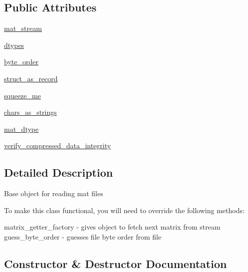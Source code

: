 \subsection*{Public Attributes}
\begin{DoxyCompactItemize}
\item 
\hyperlink{classscipy_1_1io_1_1matlab_1_1miobase_1_1MatFileReader_ac0532e904a5a082297623aebdcfb2376}{mat\+\_\+stream}
\item 
\hyperlink{classscipy_1_1io_1_1matlab_1_1miobase_1_1MatFileReader_ada49fb40fb84de4e19a59eeafece6a0e}{dtypes}
\item 
\hyperlink{classscipy_1_1io_1_1matlab_1_1miobase_1_1MatFileReader_ab4c985b94779e6e3b777efff02341cde}{byte\+\_\+order}
\item 
\hyperlink{classscipy_1_1io_1_1matlab_1_1miobase_1_1MatFileReader_a890f989a74e10934d37a62b93f9310ef}{struct\+\_\+as\+\_\+record}
\item 
\hyperlink{classscipy_1_1io_1_1matlab_1_1miobase_1_1MatFileReader_a6b293b6944a59b8e6a8729d265ff3ad8}{squeeze\+\_\+me}
\item 
\hyperlink{classscipy_1_1io_1_1matlab_1_1miobase_1_1MatFileReader_a2c742fbe640c4773aa56174face7c40f}{chars\+\_\+as\+\_\+strings}
\item 
\hyperlink{classscipy_1_1io_1_1matlab_1_1miobase_1_1MatFileReader_a9e35872c175adcc6c1a02e337fa92cf1}{mat\+\_\+dtype}
\item 
\hyperlink{classscipy_1_1io_1_1matlab_1_1miobase_1_1MatFileReader_a7795786ca2430e2b468b1cb409041dc5}{verify\+\_\+compressed\+\_\+data\+\_\+integrity}
\end{DoxyCompactItemize}


\subsection{Detailed Description}
\begin{DoxyVerb}Base object for reading mat files

To make this class functional, you will need to override the
following methods:

matrix_getter_factory   - gives object to fetch next matrix from stream
guess_byte_order        - guesses file byte order from file
\end{DoxyVerb}
 

\subsection{Constructor \& Destructor Documentation}
\hypertarget{classscipy_1_1io_1_1matlab_1_1miobase_1_1MatFileReader_a1610ec454532e7cdcf2cd5a660477db6}{}

